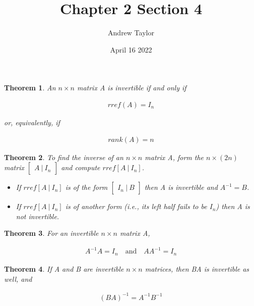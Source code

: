 \documentclass{article}
\title{Chapter 2 Section 4}
\author{Andrew Taylor}
\date{April 16 2022}
\newtheorem{theorem}{Theorem}
\begin{document}
\maketitle

\begin{theorem}
An $n \times n$ matrix A is invertible if and only if

\begin{align*}
rref(A) = I_{n}
\end{align*}

or, equivalently, if

\begin{align*}
rank(A) = n
\end{align*}

\end{theorem}

\begin{theorem}
To find the inverse of an $n \times n$ matrix A, form the $n \times (2n)$ matrix $\begin{bmatrix} A \ \vert \ I_{n} \end{bmatrix}$ and compute $rref [A \ \vert \ I_{n}]$. 

\begin{itemize}
\item If $rref [A \ \vert \ I_{n}]$ is of the form $\begin{bmatrix} I_{n} \ \vert \ B \end{bmatrix}$ then A is invertible and $A^{-1} = B$.
\item If $rref [A \ \vert \ I_{n}]$ is of another form (i.e., its left half fails to be $I_{n}$) then A is not invertible. 
\end{itemize}
\end{theorem}

\begin{theorem}
For an invertible $n \times n$ matrix A, 

\begin{align*}
A^{-1} A = I_{n} \quad \textrm{and} \quad AA^{-1} = I_{n}
\end{align*}
\end{theorem}

\begin{theorem}
If A and B are invertible $n \times n$ matrices, then BA is invertible as well, and 

\begin{align*}
(BA)^{-1} = A^{-1} B^{-1}
\end{align*}
\end{theorem}
\end{document}

